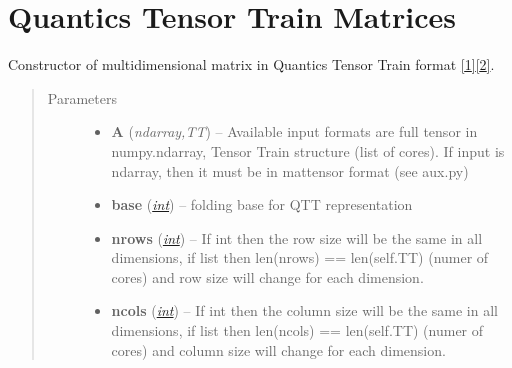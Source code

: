 \documentclass[a4paper,10pt,english]{sphinxmanual}
\begin{document}
\section{Quantics Tensor Train Matrices}
\label{api-qttmat::doc}\label{api-qttmat:quantics-tensor-train-matrices}\label{api-qttmat:module-TensorToolbox}

\begin{fulllineitems}
\label{api-qttmat:TensorToolbox.core.QTTmat}
Constructor of multidimensional matrix in Quantics Tensor Train format {\hyperref[zrefs:khoromskij2010]{{[}1{]}}}{\hyperref[zrefs:khoromskij2011]{{[}2{]}}}.
\begin{quote}\begin{description}
\item[{Parameters}] \leavevmode\begin{itemize}
\item {} 
\textbf{A} (\emph{ndarray,TT}) -- Available input formats are full tensor in numpy.ndarray, Tensor Train structure (list of cores). If input is ndarray, then it must be in mattensor format (see aux.py)

\item {} 
\textbf{base} (\href{http://docs.python.org/library/functions.html\#int}{\emph{int}}) -- folding base for QTT representation

\item {} 
\textbf{nrows} (\href{http://docs.python.org/library/functions.html\#int}{\emph{int}}) -- If int then the row size will be the same in all dimensions, if list then len(nrows) == len(self.TT) (numer of cores) and row size will change for each dimension.

\item {} 
\textbf{ncols} (\href{http://docs.python.org/library/functions.html\#int}{\emph{int}}) -- If int then the column size will be the same in all dimensions, if list then len(ncols) == len(self.TT) (numer of cores) and column size will change for each dimension.

\end{itemize}

\end{description}\end{quote}


\end{fulllineitems}
\end{document}
